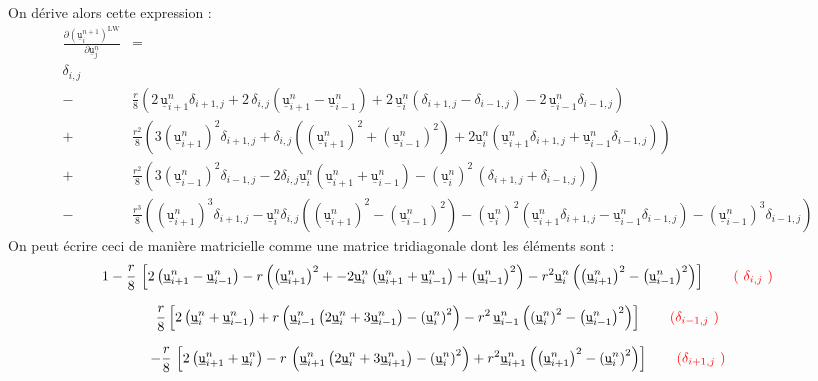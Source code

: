 \documentclass[a4paper,12pt]{article}
\newcommand{\bepar}[1]{
	\left( #1 \right)  
}
\newcommand{\becro}[1]{
	\left[ #1 \right]  
}
\newcommand{\uin}[2]{
	\underline{\texttt{u}}_{#1}^{#2}
}
\newcommand{\ui}[1]{
	\underline{\texttt{u}}_{#1}^{n}
}
\newcommand{\dij}[1]{
	\delta_{#1,j}
}
\newcommand\red{\color{red}}
\numberwithin{equation}{section} %
\begin{document}
On dérive alors cette expression :
\begin{align*}
\frac{\partial \bepar{\uin{i}{n+1}}^\text{LW}}{\partial \ui{j} } &= \\
 \dij{i} \\
-\ & \frac{r}{8} \bepar{2\, \ui{i+1} \dij{i+1} + 2\, \dij{i}\bepar{\ui{i+1} - \ui{i-1}} + 2\, \ui{i}\bepar{\dij{i+1}- \dij{i-1}} - 2\, \ui{i-1} \dij{i-1}} \\
+\ & \frac{r^2}{8} \bepar{ 3\bepar{\ui{i+1}}^2\dij{i+1} + \dij{i}\bepar{\bepar{\ui{i+1}}^2 + \bepar{\ui{i-1}}^2} + 2\ui{i}\bepar{\ui{i+1}\dij{i+1} + \ui{i-1}\dij{i-1}}} \\
+\ & \frac{r^2}{8} \bepar{3\bepar{\ui{i-1}}^2\dij{i-1} -2\dij{i}\ui{i}\bepar{\ui{i+1} + \ui{i-1}} - \bepar{\ui{i}}^2\,\bepar{\dij{i+1} + \dij{i-1}}} \\
-\ & \frac{r^3}{8}\bepar{\bepar{\ui{i+1}}^3 \dij{i+1} -\ui{i}\dij{i}\bepar{\bepar{\ui{i+1}}^2 - \bepar{\ui{i-1}}^2}- \bepar{\ui{i}}^2\bepar{\ui{i+1}\dij{i+1} - \ui{i-1}\dij{i-1}} -\bepar{\ui{i-1}}^3\dij{i-1} }
\end{align*}
On peut écrire ceci de manière matricielle comme une matrice tridiagonale dont les éléments sont :
\begin{equation} 
 1 - \frac{r}{8}\, \becro{2\bepar{\ui{i+1} - \ui{i-1}} - r \bepar{\bepar{\ui{i+1}}^2 + -2\ui{i}\bepar{\ui{i+1} + \ui{i-1}} + \bepar{\ui{i-1}}^2} -r^2\ui{i}\bepar{\bepar{\ui{i+1}}^2 - \bepar{\ui{i-1}}^2 }}
 \red \tag{ $\dij{i}$ }
 \end{equation} 
 
 \begin{equation} 
 \frac{r}{8}\becro{ 2\bepar{\ui{i}+\ui{i-1}} + r\bepar{\ui{i-1}\bepar{2\ui{i} + 3\ui{i-1}} -\bepar{\ui{i}}^2} -r^2\, \ui{i-1}\bepar{\bepar{\ui{i}}^2 - \bepar{\ui{i-1}}^2} }
 \red \tag{$\dij{i-1}$ }
 \end{equation}
 
 \begin{equation}
 - \frac{r}{8}\, \becro{2\bepar{\ui{i+1} + \ui{i}} - r\,\bepar{\ui{i+1} \bepar{2\ui{i} + 3\ui{i+1}} -\bepar{\ui{i}}^2} + r^2\ui{i+1}\bepar{\bepar{\ui{i+1}}^2 - \bepar{\ui{i}}^2}}
 \red \tag{$\dij{i+1}$ }
 \end{equation}
 
\end{document}

